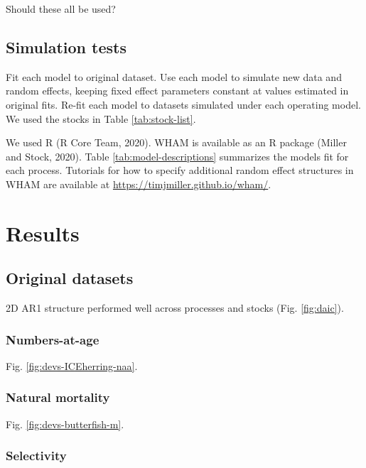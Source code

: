 \documentclass[]{article}
\begin{document}
Should these all be used?

\hypertarget{simulation-tests}{%
\subsection{Simulation tests}\label{simulation-tests}}

Fit each model to original dataset. Use each model to simulate new data
and random effects, keeping fixed effect parameters constant at values
estimated in original fits. Re-fit each model to datasets simulated
under each operating model. We used the stocks in Table
\ref{tab:stock-list}.

We used R (R Core Team, 2020). WHAM is available as an R package (Miller
and Stock, 2020). Table \ref{tab:model-descriptions} summarizes the
models fit for each process. Tutorials for how to specify additional
random effect structures in WHAM are available at
\url{https://timjmiller.github.io/wham/}.

\hypertarget{results}{%
\section{Results}\label{results}}

\hypertarget{original-datasets}{%
\subsection{Original datasets}\label{original-datasets}}

2D AR1 structure performed well across processes and stocks (Fig.
\ref{fig:daic}).

\hypertarget{numbers-at-age}{%
\subsubsection{Numbers-at-age}\label{numbers-at-age}}

Fig. \ref{fig:devs-ICEherring-naa}.

\hypertarget{natural-mortality}{%
\subsubsection{Natural mortality}\label{natural-mortality}}

Fig. \ref{fig:devs-butterfish-m}.

\hypertarget{selectivity}{%
\subsubsection{Selectivity}\label{selectivity}}
\end{document}
